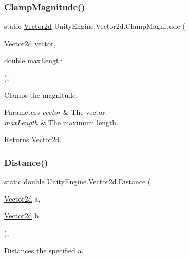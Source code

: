 \subsubsection{\texorpdfstring{Clamp\+Magnitude()}{ClampMagnitude()}}
{\footnotesize\ttfamily static \hyperlink{struct_unity_engine_1_1_vector2d}{Vector2d} Unity\+Engine.\+Vector2d.\+Clamp\+Magnitude (\begin{DoxyParamCaption}\item[{\hyperlink{struct_unity_engine_1_1_vector2d}{Vector2d}}]{vector,  }\item[{double}]{max\+Length }\end{DoxyParamCaption})\hspace{0.3cm}{\ttfamily [inline]}, {\ttfamily [static]}}



Clamps the magnitude. 


\begin{DoxyParams}{Parameters}
{\em vector} & The vector.\\
\hline
{\em max\+Length} & The maximum length.\\
\hline
\end{DoxyParams}
\begin{DoxyReturn}{Returns}
\hyperlink{struct_unity_engine_1_1_vector2d}{Vector2d}.
\end{DoxyReturn}
\mbox{\label{struct_unity_engine_1_1_vector2d_a12f6521fad98bcb5ccbd9fddf49a0833}} 
\subsubsection{\texorpdfstring{Distance()}{Distance()}}
{\footnotesize\ttfamily static double Unity\+Engine.\+Vector2d.\+Distance (\begin{DoxyParamCaption}\item[{\hyperlink{struct_unity_engine_1_1_vector2d}{Vector2d}}]{a,  }\item[{\hyperlink{struct_unity_engine_1_1_vector2d}{Vector2d}}]{b }\end{DoxyParamCaption})\hspace{0.3cm}{\ttfamily [inline]}, {\ttfamily [static]}}



Distances the specified a. 


